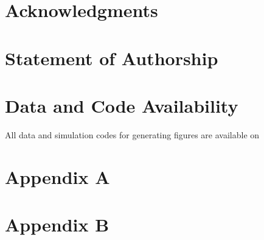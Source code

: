 \documentclass[11pt]{article}
\begin{document}

 \section*{Acknowledgments}


 \section*{Statement of Authorship}
 
\section*{Data and Code Availability}
All data and simulation codes for generating figures are available on 



\newpage{}

\renewcommand{\theequation}{A\arabic{equation}}
\renewcommand{\thetable}{A\arabic{table}}
\renewcommand{\thefigure}{A\arabic{figure}}

\setcounter{figure}{0}
\setcounter{equation}{0}  %
\setcounter{table}{0}

\section*{Appendix A}


\section*{Appendix B}


\newpage{}

%
%
\end{document}
